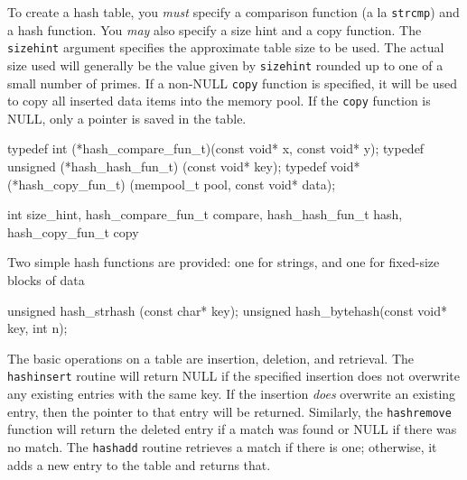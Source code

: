 To create a hash table, you \emph{must} specify a comparison
function (a la {\tt{}strcmp}) and a hash function.  You \emph{may}
also specify a size hint and a copy function.  The {\tt{}size{}hint}
argument specifies the approximate table size to be used.
The actual size used will generally be the value given by 
{\tt{}size{}hint} rounded up to one of a small number of primes.
If a non-NULL {\tt{}copy} function is specified, it will be used to
copy all inserted data items into the memory pool.  If the
{\tt{}copy} function is NULL, only a pointer is saved in the table.

\nwenddocs{}\endmoddef
typedef int      (*hash_compare_fun_t)(const void* x, const void* y);
typedef unsigned (*hash_hash_fun_t)   (const void* key);
typedef void*    (*hash_copy_fun_t)   (mempool_t pool, const void* data);

\nwendcode{}\nwdocspar

\nwenddocs{}\endmoddef
int size_hint,
hash_compare_fun_t compare,
hash_hash_fun_t    hash,
hash_copy_fun_t    copy
\nwendcode{}\nwdocspar

Two simple hash functions are provided: one for strings, and
one for fixed-size blocks of data

\nwenddocs{}\plusendmoddef
unsigned hash_strhash (const char* key);
unsigned hash_bytehash(const void* key, int n);

\nwendcode{}\nwdocspar

The basic operations on a table are insertion, deletion, and retrieval.
The {\tt{}hash{}insert} routine will return NULL if the specified insertion
does not overwrite any existing entries with the same key.  If the
insertion \emph{does} overwrite an existing entry, then the pointer to
that entry will be returned.  Similarly, the {\tt{}hash{}remove} function
will return the deleted entry if a match was found or NULL if there
was no match.  The {\tt{}hash{}add} routine retrieves a match if there is
one; otherwise, it adds a new entry to the table and returns that.

